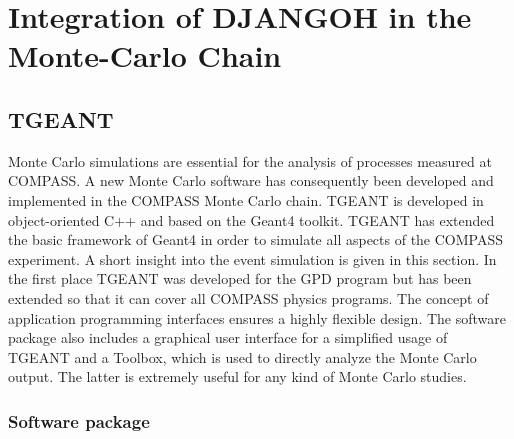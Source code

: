 
\chapter{Integration of DJANGOH in the Monte-Carlo Chain} %

\label{ch:MC} %


\section{TGEANT}

Monte Carlo simulations are essential for the analysis of processes measured at COMPASS. A new Monte Carlo software has consequently been developed and implemented in the COMPASS Monte Carlo chain. TGEANT is developed in object-oriented C++ and based on the Geant4 toolkit. TGEANT has extended the basic framework of Geant4 in order to simulate all aspects of the COMPASS experiment. A short insight into the event simulation is given in this section.
In the first place TGEANT was developed for the GPD program but has been extended so that it can cover all COMPASS physics programs. The concept of application programming interfaces ensures a highly flexible design. The software package also includes a graphical user interface for a simplified usage of TGEANT and a Toolbox, which is used to directly analyze the Monte Carlo output. The latter is extremely useful for any kind of Monte Carlo studies.

\subsection{Software package}

